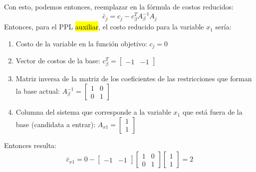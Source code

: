 Con esto, podemos entonces, reemplazar en la fórmula de costos reducidos:
\[
  \bar{c}_j = c_j - c_\beta^T A_\beta^{-1} A_j
\]
Entonces, para el PPL \hl{auxiliar}, el costo reducido para la variable \(x_1\) sería:
\begin{enumerate}
  \item Costo de la variable en la función objetivo: \(c_j = 0\)
  \item Vector de costos de la base: \(c_\beta^T = \begin{bmatrix} -1 & -1 \end{bmatrix}\)
  \item Matriz inversa de la matriz de los coeficientes de las restricciones que forman la base actual: \(A_\beta^{-1} = \begin{bmatrix} 1 & 0\\ 0 & 1 \end{bmatrix}\)
  \item Columna del sistema que corresponde a la variable \(x_1\) que está fuera de la base (candidata a entrar): \(A_{x1} = \begin{bmatrix} 1\\ 1 \end{bmatrix}\)
\end{enumerate}
Entonces resulta:
\begin{align*}
  \bar{c}_{x1} = 0 - \begin{bmatrix} -1 & -1 \end{bmatrix} \begin{bmatrix} 1 & 0\\ 0 & 1 \end{bmatrix} \begin{bmatrix} 1\\ 1 \end{bmatrix} = 2
\end{align*}


